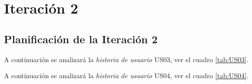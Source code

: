\section{Iteración 2}
\label{sec:iteracion_2}

%
%


%
%
%


\subsection{Planificación de la Iteración 2}

A continuación se analizará la \emph{historia de usuario} US03, ver el cuadro \ref{tab:US03}.

    

    



  A continuación se analizará la \emph{historia de usuario} US04, ver el cuadro \ref{tab:US04}.

    

    

